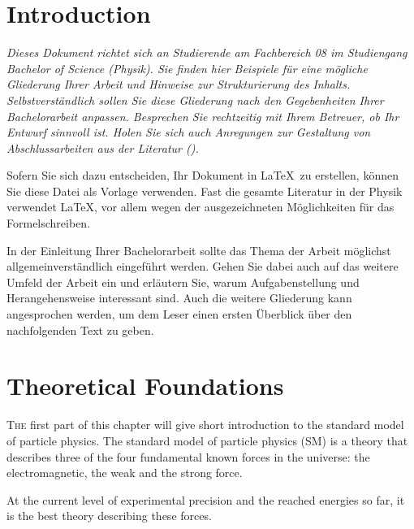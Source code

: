 \documentclass[a4paper,11pt,twosided,final,german,openbib,pdftex,listof=totoc,bibliography=totoc]{scrbook}
\begin{document}
\renewcommand\contentsname{Contents}
\renewcommand\figurename{Figure}
\renewcommand\tablename{Table}
\tableofcontents
\clearpage

\mainmatter
\sloppy

\chapter{Introduction}
\label{sec:Introduction}

{\em Dieses Dokument richtet sich an Studierende am Fachbereich 08 im 
Studiengang Bachelor of Science (Physik). Sie finden hier Beispiele 
f\"ur eine m\"ogliche Gliederung Ihrer Arbeit und Hinweise zur 
Strukturierung des Inhalts. Selbstverst\"andlich sollen Sie diese 
Gliederung nach den Gegebenheiten Ihrer Bachelorarbeit anpassen. 
Besprechen Sie rechtzeitig mit Ihrem Betreuer, ob Ihr Entwurf sinnvoll 
ist. Holen Sie sich auch Anregungen zur Gestaltung von Abschlussarbeiten 
aus der Literatur ().
\medskip

Sofern Sie sich dazu entscheiden, Ihr Dokument in \LaTeX\ zu erstellen, 
k\"onnen Sie diese Datei als Vorlage verwenden. Fast die gesamte 
Literatur in der Physik verwendet \LaTeX, vor allem wegen der 
ausgezeichneten M\"oglichkeiten f\"ur das Formelschreiben.
}
\bigskip

In der Einleitung Ihrer Bachelorarbeit sollte das Thema der Arbeit 
m\"oglichst allgemeinverst\"andlich eingef\"uhrt werden. Gehen Sie 
dabei auch auf das weitere Umfeld der Arbeit ein und erl\"autern Sie, 
warum Aufgabenstellung und Herangehensweise interessant sind. Auch 
die weitere Gliederung kann angesprochen werden, um dem Leser einen 
ersten \"Uberblick \"uber den nachfolgenden Text zu geben.

\chapter{Theoretical Foundations}
\label{cha:SM}

\lettrine{T}{he} first part of this chapter will give  short introduction to the standard model of particle physics. The standard model of particle physics (SM) is a theory that describes three of the four fundamental known forces in the universe: the electromagnetic, the weak and the strong force. 

 At the current level of experimental precision and the reached energies so far, it is the best theory describing these forces.
 
\end{document}
